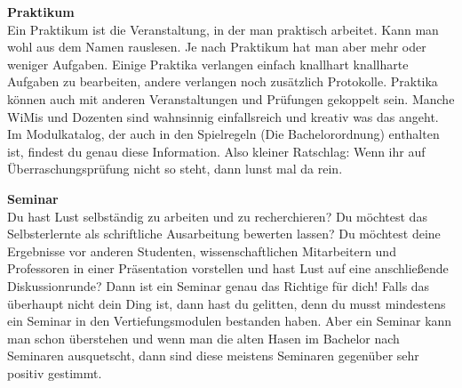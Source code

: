 \textbf{Praktikum}\\
Ein Praktikum ist die Veranstaltung, in der man praktisch arbeitet. Kann man wohl aus dem Namen rauslesen. Je nach Praktikum hat man aber mehr oder weniger Aufgaben. Einige Praktika verlangen einfach knallhart knallharte Aufgaben zu bearbeiten, andere verlangen noch zusätzlich Protokolle. Praktika können auch mit anderen Veranstaltungen und Prüfungen gekoppelt sein. Manche WiMis und Dozenten sind wahnsinnig einfallsreich und kreativ was das angeht. Im Modulkatalog, der auch in den Spielregeln (Die Bachelorordnung) enthalten ist, findest du genau diese Information. Also kleiner Ratschlag: Wenn ihr auf Überraschungsprüfung nicht so steht, dann lunst mal da rein.

\textbf{Seminar}\\
Du hast Lust selbständig zu arbeiten und zu recherchieren? Du möchtest das Selbsterlernte als schriftliche Ausarbeitung bewerten lassen? Du möchtest deine Ergebnisse vor anderen Studenten, wissenschaftlichen Mitarbeitern und Professoren in einer Präsentation vorstellen und hast Lust auf eine anschließende Diskussionrunde? Dann ist ein Seminar genau das Richtige für dich! Falls das überhaupt nicht dein Ding ist, dann hast du gelitten, denn du musst mindestens ein Seminar in den Vertiefungsmodulen bestanden haben. Aber ein Seminar kann man schon überstehen und wenn man die alten Hasen im Bachelor nach Seminaren ausquetscht, dann sind diese meistens Seminaren gegenüber sehr positiv gestimmt.

